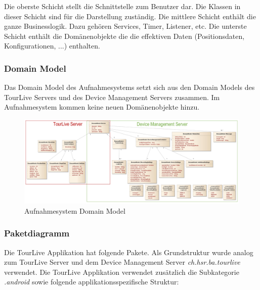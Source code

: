 Die oberste Schicht stellt die Schnittstelle zum Benutzer dar. Die Klassen in dieser Schicht sind für die Darstellung zuständig. Die mittlere Schicht enthält die ganze Businesslogik. Dazu gehören Services, Timer, Listener, etc. Die unterste Schicht enthält die Domänenobjekte die die effektiven Daten (Positionsdaten, Konfigurationen, ...) enthalten. 

\subsubsection{Domain Model}
Das Domain Model des Aufnahmesystems setzt sich aus den Domain Models des TourLive Servers und des Device Management Servers zusammen. Im Aufnahmesystem kommen keine neuen Domänenobjekte hinzu.

\begin{figure}[H]
\centering
\includegraphics[width=130mm]{images/android/domainmodel.jpg}
\caption{Aufnahmesystem Domain Model}
\end{figure}

\subsubsection{Paketdiagramm}
Die TourLive Applikation hat folgende Pakete. Als Grundstruktur wurde analog zum TourLive Server und dem Device Management Server \textit{ch.hsr.ba.tourlive} verwendet. Die TourLive Applikation verwendet zusätzlich die Subkategorie \textit{.android} sowie folgende applikationsspezifische Struktur:

